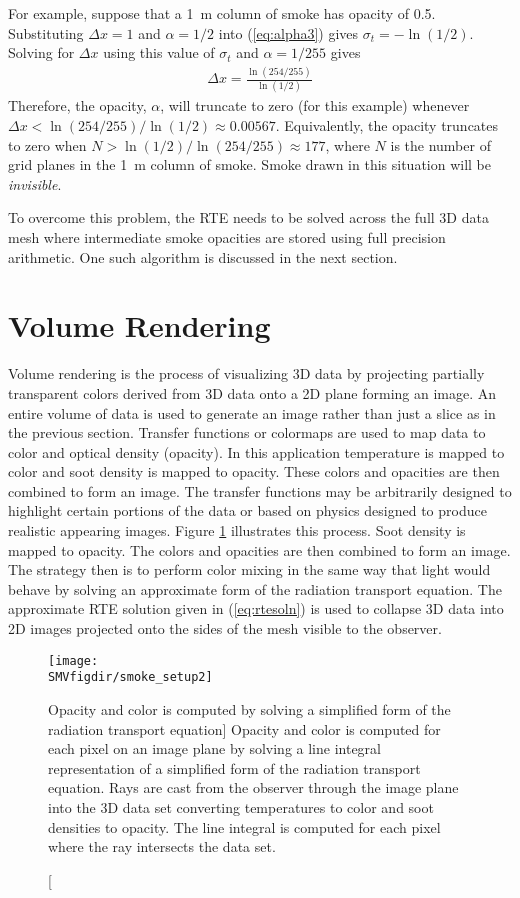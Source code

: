{For example, suppose that a 1~m column of smoke has opacity of
0.5.  Substituting $\Delta x=1$ and $\alpha=1/2$ into
(\ref{eq:alpha3}) gives $\sigma_t=-\ln(1/2)$.  Solving for $\Delta
x$ using this value of $\sigma_t$ and $\alpha=1/255$ gives
\begin{eqnarray}
\Delta x = \frac{\ln(254/255)}{\ln(1/2)}
\end{eqnarray}
Therefore, the opacity, $\alpha$, will truncate to zero (for this
example) whenever $\Delta x<\ln(254/255)/\ln(1/2)\approx 0.00567$.
Equivalently, the opacity truncates to zero when
$N>\ln(1/2)/\ln(254/255)\approx 177$, where $N$ is the number of
grid planes in the 1~m column of smoke.  Smoke drawn in this
situation will be {\em invisible}.

To overcome this problem, the RTE needs to be solved across the
full 3D data mesh where intermediate smoke opacities are stored
using full precision arithmetic.  One such algorithm is discussed
in the next section.


\section{Volume Rendering}
Volume rendering is the process of visualizing 3D data by
projecting partially transparent colors derived from 3D data onto
a 2D plane forming an image.  An entire volume of data is used to
generate an image rather than just a slice as in the previous
section.  Transfer functions or colormaps are used to map data to
color and optical density (opacity).  In this application
temperature is mapped to color and soot density is mapped to
opacity.  These colors and opacities are then combined to form an
image.  The transfer functions may be arbitrarily designed to
highlight certain portions of the data or based on physics
designed to produce realistic appearing images.  Figure
\ref{figsmokesetup2} illustrates this process. Soot density is
mapped to opacity.  The colors and opacities are then combined to
form an image.  The strategy then is to perform color mixing in
the same way that light would behave by solving an approximate
form of the radiation transport equation.  The approximate RTE
solution given in (\ref{eq:rtesoln})  is used to collapse 3D data
into 2D images projected onto the sides of the mesh visible to the
observer.

\begin{figure}[bph]
\begin{center}
\texttt{[image: \\SMVfigdir/smoke\_setup2]}
\end{center}
\caption
[Opacity and color is computed by solving a simplified
form of the radiation transport equation]
{Opacity and color is
computed for each pixel on an image plane by solving a line
integral representation of a simplified form of the radiation
transport equation.  Rays are cast from the observer through the
image plane into the 3D data set converting temperatures to color
and soot densities to opacity.  The line integral is computed for
each pixel where the ray intersects the data set. }
\label{figsmokesetup2}
\end{figure}

}
